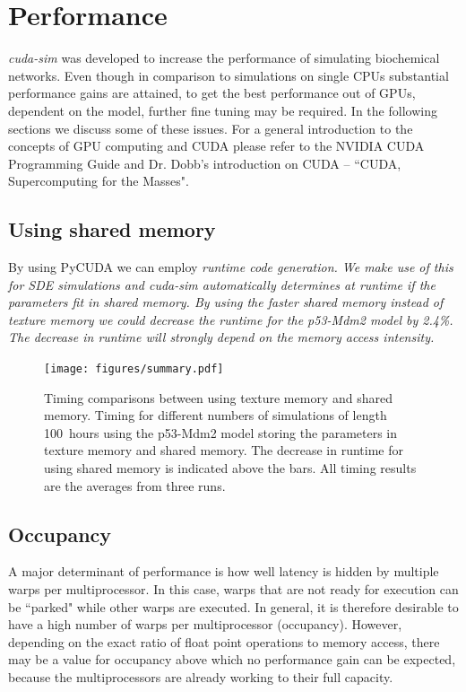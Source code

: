 \documentclass [11pt, a4paper, openany, twoside=off] {article}
\begin{document}
\newpage
\section{Performance}
\emph{cuda-sim} was developed to increase the performance of simulating biochemical networks. Even though in comparison to simulations on single CPUs substantial performance gains are attained, to get the best performance out of GPUs, dependent on the model, further fine tuning may be required. In the following sections we discuss some of these issues. For a general introduction to the concepts of GPU computing and CUDA please refer to the NVIDIA CUDA Programming Guide and Dr. Dobb's introduction on CUDA -- ``CUDA, Supercomputing for the Masses".

\subsection{Using shared memory}
By using PyCUDA we can employ \em{runtime code generation}. We make use of this for SDE simulations and \em{cuda-sim} automatically determines at runtime if the parameters fit in shared memory. By using the faster shared memory instead of texture memory we could decrease the runtime for the p53-Mdm2 model by 2.4\%. The decrease in runtime will strongly depend on the memory access intensity. 

\begin{figure}[h!]%
	\centering
	\texttt{[image: figures/summary.pdf]}
	\caption{Timing comparisons between using texture memory and shared memory. Timing for different numbers of simulations of length 100~hours using the p53-Mdm2 model storing the parameters in texture memory and shared memory. The decrease in runtime for using shared memory is indicated above the bars. All timing results are the averages from three runs.}
	\label{fig:ex_p53}
\end{figure}

\subsection{Occupancy}
A major determinant of performance is how well latency is hidden by multiple warps per multiprocessor. In this case, warps that are not ready for execution can be ``parked" while other warps are executed. In general, it is therefore desirable to have a high number of warps per multiprocessor (occupancy). However, depending on the exact ratio of float point operations to memory access, there may be a value for occupancy above which no performance gain can be expected, because the multiprocessors are already working to their full capacity.
\end{document}
